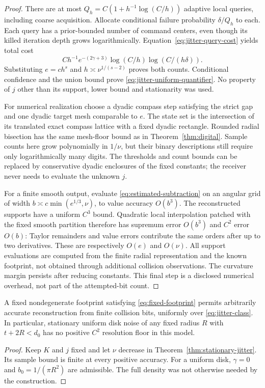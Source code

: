 \begin{proof}
There are at most $Q_h=C(1+h^{-1}\log(C/h))$ adaptive local queries,
including coarse acquisition. Allocate conditional failure probability
$\delta/Q_h$ to each. Each query has a prior-bounded number of command
centers, even though its killed iteration depth grows logarithmically.
Equation~\eqref{eq:jitter-query-cost} yields total cost
\[
 C h^{-1}e^{-(2\gamma+3)}\log(C/h)\log(C/(h\delta)).
\]
Substituting $e=c h^s$ and $h\asymp\nu^{1/(s-2)}$ proves both counts.
Conditional confidence and the union bound prove
\eqref{eq:jitter-uniform-quantifier}. No property of $j$ other than its
support, lower bound and stationarity was used.

For numerical realization choose a dyadic compass step satisfying the
strict gap and one dyadic target mesh comparable to $e$. The state set
is the intersection of its translated exact compass lattice with a
fixed dyadic rectangle. Rounded radial bisection has the same mesh-floor
bound as in Theorem~\ref{thm:digital}. Sample counts here grow
polynomially in $1/\nu$, but their binary descriptions still require
only logarithmically many digits. The thresholds and count bounds can
be replaced by conservative dyadic enclosures of the fixed constants;
the receiver never needs to evaluate the unknown $j$.

For a finite smooth output, evaluate \eqref{eq:estimated-subtraction}
on an angular grid of width $b\asymp c\min(e^{1/3},\nu)$, to value
accuracy $O(b^3)$. The reconstructed supports have a uniform $C^3$
bound. Quadratic local interpolation patched with the fixed smooth
partition therefore has supremum error $O(b^3)$ and $C^2$ error
$O(b)$: Taylor remainders and value errors contribute the same orders
after up to two derivatives. These are respectively $O(e)$ and
$O(\nu)$. All support evaluations are computed from the finite radial
representation and the known footprint, not obtained through additional
collision observations. The curvature margin persists after reducing
constants. This final step is a disclosed numerical overhead, not part
of the attempted-bit count.
\end{proof}

\begin{corollary}
\label{cor:no-jitter-floor}
A fixed nondegenerate footprint satisfying \eqref{eq:fixed-footprint}
permits arbitrarily accurate reconstruction from finite collision bits,
uniformly over \eqref{eq:jitter-class}. In particular, stationary
uniform disk noise of any fixed radius $R$ with $t+2R<d_0$ has no
positive $C^2$ resolution floor in this model.
\end{corollary}
\begin{proof}
Keep $K$ and $j$ fixed and let $\nu$ decrease in
Theorem~\ref{thm:stationary-jitter}. Its sample bound is finite at every
positive accuracy. For a uniform disk, $\gamma=0$ and
$b_0=1/(\pi R^2)$ are admissible. The full density was not otherwise
needed by the construction.
\end{proof}

